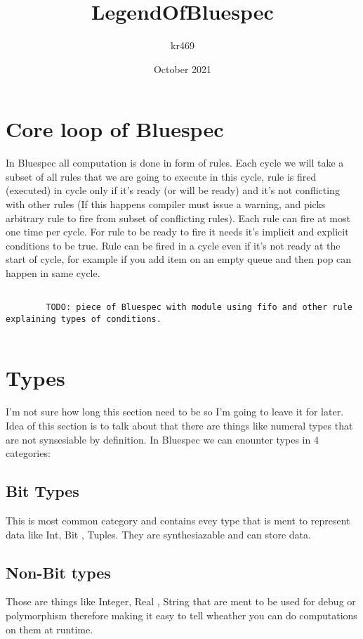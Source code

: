 \documentclass{article}
\title{LegendOfBluespec}
\author{kr469 }
\date{October 2021}
\begin{document}
\maketitle

\section{Core loop of Bluespec}
    In Bluespec all computation is done in form of rules. Each cycle we will take a subset of all rules that we are going to execute in this cycle, rule is fired (executed) in cycle only if it's ready (or will be ready) and it's not conflicting with other rules (If this happens compiler must issue a warning, and picks arbitrary rule to fire from subset of conflicting rules). Each rule can fire at most one time per cycle. For rule to be ready to fire it needs it's implicit and explicit conditions to be true. Rule can be fired in a cycle even if it's not ready at the start of cycle, for example if you add item on an empty queue and then pop can happen in same cycle.
    \begin{verbatim}
        
        TODO: piece of Bluespec with module using fifo and other rule explaining types of conditions.
        
    \end{verbatim}

\section{Types}
    I'm not sure how long this section need to be so I'm going to leave it for later. Idea of this section is to talk about that there are things like numeral types that are not synsesiable by definition.
    In Bluespec we can enounter types in 4 categories:
    \subsection{Bit Types}
        This is most common category and contains evey type that is ment to represent data like Int, Bit , Tuples. They are synthesiazable and can store data.
    \subsection{Non-Bit types}
        Those are things like Integer, Real , String that are ment to be used for debug or polymorphism therefore making it easy to tell wheather you can do computations on them at runtime. 
\end{document}
